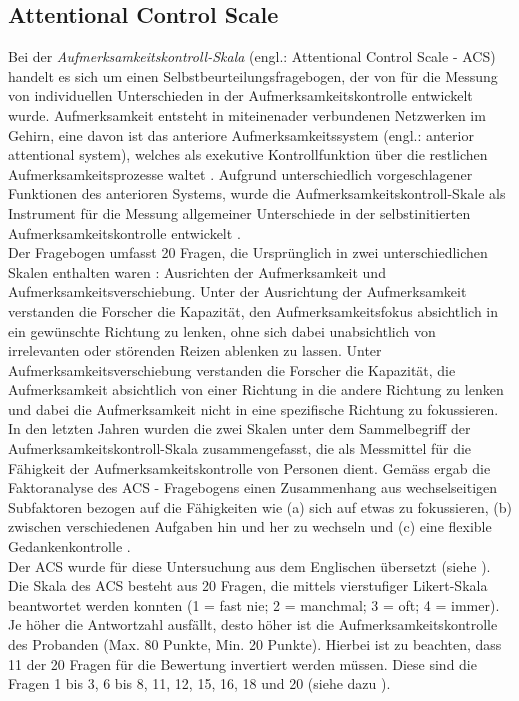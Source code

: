 \subsection{Attentional Control Scale} \label{subsection.acs}
Bei der \textit{Aufmerksamkeitskontroll-Skala} (engl.: Attentional Control Scale - ACS) handelt es sich um einen Selbstbeurteilungsfragebogen, der von  für die Messung von individuellen Unterschieden in der Aufmerksamkeitskontrolle entwickelt wurde. Aufmerksamkeit entsteht in miteinenader verbundenen Netzwerken im Gehirn, eine davon ist das anteriore Aufmerksamkeitssystem (engl.: anterior attentional system), welches als exekutive Kontrollfunktion über die restlichen Aufmerksamkeitsprozesse waltet \cite{Posner1998}. Aufgrund unterschiedlich vorgeschlagener Funktionen des anterioren Systems, wurde die Aufmerksamkeitskontroll-Skale als Instrument für die Messung allgemeiner Unterschiede in der selbstinitierten Aufmerksamkeitskontrolle entwickelt \cite{Derryberry2001}.\\
Der Fragebogen umfasst 20 Fragen, die Ursprünglich in zwei unterschiedlichen Skalen enthalten waren \cite{Derryberry1988}: Ausrichten der Aufmerksamkeit und Aufmerksamkeitsverschiebung. Unter der Ausrichtung der Aufmerksamkeit verstanden die Forscher die Kapazität, den Aufmerksamkeitsfokus absichtlich in ein gewünschte Richtung zu lenken, ohne sich dabei unabsichtlich von irrelevanten oder störenden Reizen ablenken zu lassen. Unter Aufmerksamkeitsverschiebung verstanden die Forscher die Kapazität, die Aufmerksamkeit absichtlich von einer Richtung in die andere Richtung zu lenken und dabei die Aufmerksamkeit nicht in eine spezifische Richtung zu fokussieren. In den letzten Jahren wurden die zwei Skalen unter dem Sammelbegriff der Aufmerksamkeitskontroll-Skala zusammengefasst, die als Messmittel für die Fähigkeit der Aufmerksamkeitskontrolle von Personen dient. Gemäss  ergab die Faktoranalyse des ACS - Fragebogens einen Zusammenhang aus wechselseitigen Subfaktoren bezogen auf die Fähigkeiten wie (a) sich auf etwas zu fokussieren, (b) zwischen verschiedenen Aufgaben hin und her zu wechseln und (c) eine flexible Gedankenkontrolle \cite[S.~226]{Derryberry2002}. \\
Der ACS wurde für diese Untersuchung aus dem Englischen übersetzt (siehe ). Die Skala des ACS besteht aus 20 Fragen, die mittels vierstufiger Likert-Skala beantwortet werden konnten (1 = fast nie; 2 = manchmal; 3 = oft; 4 = immer). Je höher die Antwortzahl ausfällt, desto höher ist die Aufmerksamkeitskontrolle des Probanden (Max. 80 Punkte, Min. 20 Punkte). Hierbei ist zu beachten, dass 11 der 20 Fragen für die Bewertung invertiert werden müssen. Diese sind die Fragen 1 bis 3, 6 bis 8, 11, 12, 15, 16, 18 und 20 (siehe dazu ).

